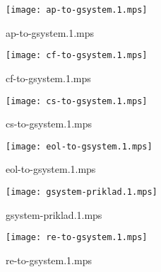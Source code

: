 \documentclass[letterpaper,10pt]{article}
\begin{document}
\begin{figure}
    \centering
    \texttt{[image: ap-to-gsystem.1.mps]}
    \caption{ap-to-gsystem.1.mps}
\end{figure}

\begin{figure}
    \centering
    \texttt{[image: cf-to-gsystem.1.mps]}
    \caption{cf-to-gsystem.1.mps}
\end{figure}

\begin{figure}
    \centering
    \texttt{[image: cs-to-gsystem.1.mps]}
    \caption{cs-to-gsystem.1.mps}
\end{figure}

\begin{figure}
    \centering
    \texttt{[image: eol-to-gsystem.1.mps]}
    \caption{eol-to-gsystem.1.mps}
\end{figure}

\begin{figure}
    \centering
    \texttt{[image: gsystem-priklad.1.mps]}
    \caption{gsystem-priklad.1.mps}
\end{figure}

\begin{figure}
    \centering
    \texttt{[image: re-to-gsystem.1.mps]}
    \caption{re-to-gsystem.1.mps}
\end{figure}
\end{document}
